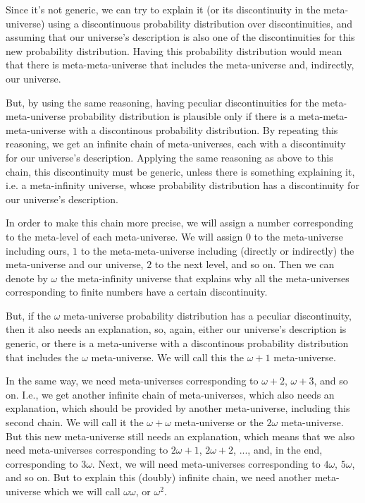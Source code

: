 \documentclass[a4paper
,draft
]{article}
\begin{document}
Since it's not generic, we can try to explain it (or its discontinuity
in the meta-universe)
using a discontinuous probability distribution over discontinuities,
and assuming that our universe's description is also one of the
discontinuities for this new probability distribution.
Having this probability distribution would mean that there is
meta-meta-universe that includes the meta-universe and, indirectly,
our universe.

But, by using the same reasoning, having peculiar discontinuities for the
meta-meta-universe probability
distribution is plausible only if there is a meta-meta-meta-universe
with a discontinous probability distribution.
By repeating this reasoning, we get an infinite chain of meta-universes,
each with a discontinuity for our universe's
description.
Applying the same reasoning as above to this chain, this discontinuity
must be generic,
unless there is something explaining it, i.e. a meta-infinity universe,
whose probability distribution has a discontinuity for our universe's
description.

In order to make this chain more precise, we will assign a number corresponding
to the meta-level of each meta-universe.
We will assign $0$ to the meta-universe including ours, $1$ to the
meta-meta-universe including (directly or indirectly) the meta-universe and our
universe, $2$ to the next level, and so on.
Then we can denote by $\omega$ the meta-infinity universe that explains why all
the meta-universes corresponding to finite numbers have a certain discontinuity.

But, if the $\omega$ meta-universe probability distribution has a peculiar
discontinuity, then it also needs an explanation, so, again,
either our universe's
description is generic, or there is a meta-universe with a discontinous
probability distribution that includes the
$\omega$ meta-universe.
We will call this the $\omega + 1$ meta-universe.

In the same way, we need meta-universes corresponding to $\omega + 2$,
$\omega + 3$, and so on.
I.e., we get another infinite chain of meta-universes, which also needs an
explanation, which should be provided by another meta-universe, including this
second chain. We will call it the $\omega + \omega$ meta-universe
or the $2\omega$ meta-universe.
But this new meta-universe still needs an explanation,
which means that we also need
meta-universes corresponding to $2\omega + 1$, $2\omega + 2$, ..., and,
in the end, corresponding to $3\omega$.
Next, we will need meta-universes
corresponding to $4\omega$, $5\omega$, and so on.
But to explain this (doubly) infinite chain,
we need another meta-universe which we
will call $\omega\omega$, or $\omega^2$.
\end{document}
